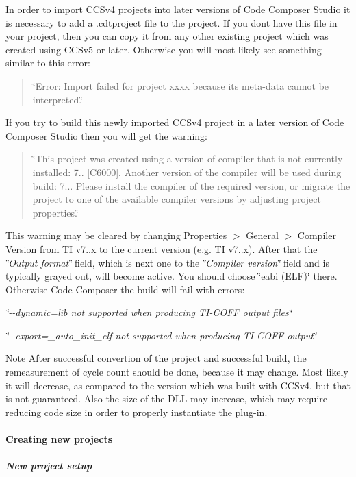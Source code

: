In order to import C\+C\+Sv4 projects into later versions of Code Composer Studio it is necessary to add a .cdtproject file to the project. If you don\textquotesingle{}t have this file in your project, then you can copy it from any other existing project which was created using C\+C\+Sv5 or later. Otherwise you will most likely see something similar to this error\+:

{\itshape \begin{quote}
\char`\"{}\+Error\+: Import failed for project \textquotesingle{}xxxx\textquotesingle{} because its meta-\/data cannot be interpreted.\char`\"{}\end{quote}
}

If you try to build this newly imported C\+C\+Sv4 project in a later version of Code Composer Studio then you will get the warning\+:

{\itshape \begin{quote}
\char`\"{}\+This project was created using a version of compiler that is not currently installed\+: 7.. \mbox{[}\+C6000\mbox{]}. Another version of the compiler will be used during build\+: 7... Please install the compiler of the required version, or migrate the project to one of the available compiler versions by adjusting project properties.\char`\"{}\end{quote}
}

This warning may be cleared by changing Properties $>$ General $>$ Compiler Version from T\+I v7..\+x to the current version (e.\+g. T\+I v7..\+x). After that the {\itshape \char`\"{}\+Output format\char`\"{}} field, which is next one to the {\itshape \char`\"{}\+Compiler version\char`\"{}} field and is typically grayed out, will become active. You should choose \char`\"{}eabi (\+E\+L\+F)\char`\"{} there. Otherwise Code Composer the build will fail with errors\+: 
\begin{DoxyItemize}
\item {\itshape \char`\"{}-\/-\/dynamic=lib not supported when producing T\+I-\/\+C\+O\+F\+F output files\char`\"{}} 
\item {\itshape \char`\"{}-\/-\/export=\+\_\+auto\+\_\+init\+\_\+elf not supported when producing T\+I-\/\+C\+O\+F\+F output\char`\"{}} 
\end{DoxyItemize}

\begin{DoxyNote}{Note}
After successful convertion of the project and successful build, the remeasurement of cycle count should be done, because it may change. Most likely it will decrease, as compared to the version which was built with C\+C\+Sv4, but that is not guaranteed. Also the size of the D\+L\+L may increase, which may require reducing code size in order to properly instantiate the plug-\/in.
\end{DoxyNote}
\hypertarget{a00362_subsubsection__creating_new_projects_}{}\paragraph{Creating new projects}\label{a00362_subsubsection__creating_new_projects_}
\subparagraph*{New project setup}

